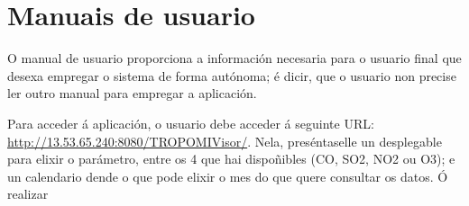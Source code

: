\chapter{Manuais de usuario}

O manual de usuario proporciona a información necesaria para o usuario final que desexa empregar o sistema de forma autónoma; é dicir, que o usuario non precise ler outro manual para empregar a
aplicación.

Para acceder á aplicación, o usuario debe acceder á seguinte URL: \url{http://13.53.65.240:8080/TROPOMIVisor/}. Nela, preséntaselle un desplegable para elixir o parámetro, entre os 4 que hai dispoñibles
(CO, SO2, NO2 ou O3); e un calendario dende o que pode elixir o mes do que quere consultar os datos. Ó realizar